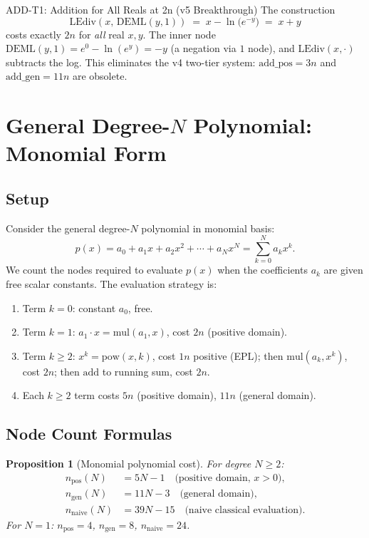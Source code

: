 \documentclass[11pt,a4paper]{article}
\newtheorem{proposition}[theorem]{Proposition}
\begin{document}
\begin{emlbox}{ADD-T1: Addition for All Reals at 2n (v5 Breakthrough)}
The construction
\[
  \mathrm{LEdiv}(x,\, \mathrm{DEML}(y,1))
  \;=\; x - \ln\!\bigl(e^{-y}\bigr)
  \;=\; x + y
\]
costs exactly $2n$ for \emph{all} real $x, y$. The inner node $\mathrm{DEML}(y,1) = e^0 - \ln(e^y) = -y$
(a negation via $1$ node), and $\mathrm{LEdiv}(x, \cdot)$ subtracts the log. This eliminates the
v4 two-tier system: $\text{add\_pos} = 3n$ and $\text{add\_gen} = 11n$ are obsolete.
\end{emlbox}

\section{General Degree-$N$ Polynomial: Monomial Form}

\subsection{Setup}

Consider the general degree-$N$ polynomial in monomial basis:
\[
  p(x) = a_0 + a_1 x + a_2 x^2 + \cdots + a_N x^N = \sum_{k=0}^{N} a_k x^k.
\]
We count the nodes required to evaluate $p(x)$ when the coefficients $a_k$ are given
free scalar constants. The evaluation strategy is:
\begin{enumerate}
  \item Term $k=0$: constant $a_0$, free.
  \item Term $k=1$: $a_1 \cdot x = \mathrm{mul}(a_1, x)$, cost $2n$ (positive domain).
  \item Term $k \geq 2$: $x^k = \mathrm{pow}(x,k)$, cost $1n$ positive (EPL); then
        $\mathrm{mul}(a_k, x^k)$, cost $2n$; then $\mathrm{add}$ to running sum, cost $2n$.
  \item Each $k \geq 2$ term costs $5n$ (positive domain), $11n$ (general domain).
\end{enumerate}

\subsection{Node Count Formulas}

\begin{proposition}[Monomial polynomial cost]
\label{prop:monomial}
  For degree $N \geq 2$:
  \begin{align*}
    n_\mathrm{pos}(N) &= 5N - 1 \quad\text{(positive domain, } x > 0\text{)},\\
    n_\mathrm{gen}(N) &= 11N - 3 \quad\text{(general domain)},\\
    n_\mathrm{naive}(N) &= 39N - 15 \quad\text{(naive classical evaluation)}.
  \end{align*}
  For $N=1$: $n_\mathrm{pos} = 4$, $n_\mathrm{gen} = 8$, $n_\mathrm{naive} = 24$.
\end{proposition}
\end{document}
